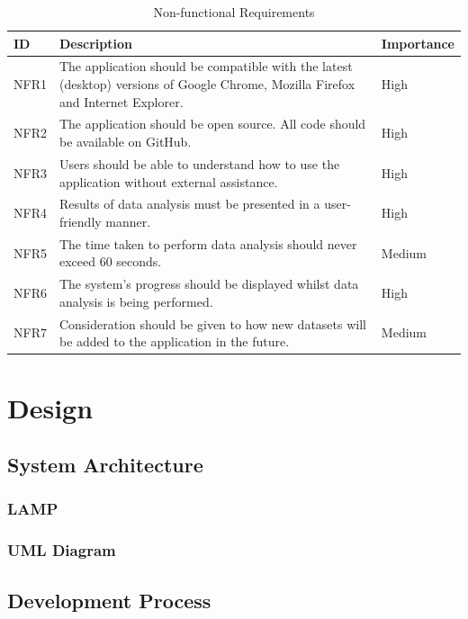 \documentclass[authoryearcitations]{UoYCSproject}
\begin{document}
\begin{table}[tbp]
\caption{Non-functional Requirements}
\begin{tabular}{| p{1.5cm} | p{7.5cm} | p{2cm} |}
	\hline
	\textbf{ID} & \textbf{Description} & \textbf{Importance} \\ \hline
	NFR1 & The application should be compatible with the latest (desktop) versions of Google Chrome, Mozilla Firefox and Internet Explorer. & High \\ \hline
	NFR2 & The application should be open source. All code should be available on GitHub. & High \\ \hline
	NFR3 & Users should be able to understand how to use the application without external assistance. & High \\ \hline
	NFR4 & Results of data analysis must be presented in a user-friendly manner. & High \\ \hline
	NFR5 & The time taken to perform data analysis should never exceed 60 seconds. & Medium \\ \hline
	NFR6 & The system's progress should be displayed whilst data analysis is being performed. & High \\ \hline
	NFR7 & Consideration should be given to how new datasets will be added to the application in the future. & Medium \\ \hline
\end{tabular}
\label{tab:NonFunctionalReqs}
\end{table}


\chapter{Design}

\section{System Architecture}

\subsection{LAMP}

\subsection{UML Diagram}

\section{Development Process}
\end{document}
